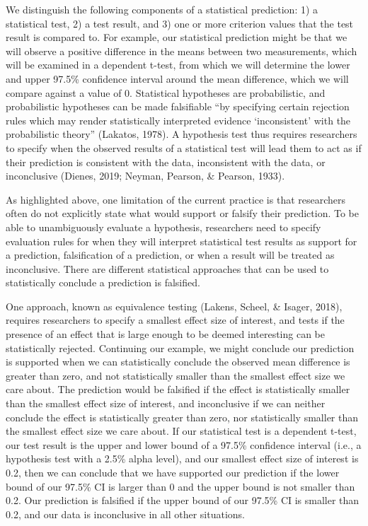 \documentclass[doc,floatsintext]{apa6}
\begin{document}
We distinguish the following components of a statistical prediction: 1) a statistical test, 2) a test result, and 3) one or more criterion values that the test result is compared to. For example, our statistical prediction might be that we will observe a positive difference in the means between two measurements, which will be examined in a dependent t-test, from which we will determine the lower and upper 97.5\% confidence interval around the mean difference, which we will compare against a value of 0. Statistical hypotheses are probabilistic, and probabilistic hypotheses can be made falsifiable ``by specifying certain rejection rules which may render statistically interpreted evidence `inconsistent' with the probabilistic theory'' (Lakatos, 1978). A hypothesis test thus requires researchers to specify when the observed results of a statistical test will lead them to act as if their prediction is consistent with the data, inconsistent with the data, or inconclusive (Dienes, 2019; Neyman, Pearson, \& Pearson, 1933).

As highlighted above, one limitation of the current practice is that researchers often do not explicitly state what would support or falsify their prediction. To be able to unambiguously evaluate a hypothesis, researchers need to specify evaluation rules for when they will interpret statistical test results as support for a prediction, falsification of a prediction, or when a result will be treated as inconclusive. There are different statistical approaches that can be used to statistically conclude a prediction is falsified.

One approach, known as equivalence testing (Lakens, Scheel, \& Isager, 2018), requires researchers to specify a smallest effect size of interest, and tests if the presence of an effect that is large enough to be deemed interesting can be statistically rejected. Continuing our example, we might conclude our prediction is supported when we can statistically conclude the observed mean difference is greater than zero, and not statistically smaller than the smallest effect size we care about. The prediction would be falsified if the effect is statistically smaller than the smallest effect size of interest, and inconclusive if we can neither conclude the effect is statistically greater than zero, nor statistically smaller than the smallest effect size we care about. If our statistical test is a dependent t-test, our test result is the upper and lower bound of a 97.5\% confidence interval (i.e., a hypothesis test with a 2.5\% alpha level), and our smallest effect size of interest is 0.2, then we can conclude that we have supported our prediction if the lower bound of our 97.5\% CI is larger than 0 and the upper bound is not smaller than 0.2. Our prediction is falsified if the upper bound of our 97.5\% CI is smaller than 0.2, and our data is inconclusive in all other situations.
\end{document}
